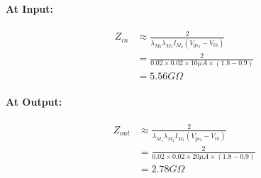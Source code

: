 \begin{enumerate}
    \paragraph{At Input:}
    \begin{align*}
      Z_{in} &\approx \frac{2}{\lambda_{M_0} \lambda_{M_3} I_{M_0} (V_{gs_3} - V_{th})} \\
             &= \frac{2}{0.02 \times 0.02 \times 10 \mu A \times (1.8 - 0.9)} \\
             &= 5.56 G\Omega
    \end{align*}
    \paragraph{At Output:}
    \begin{align*}
      Z_{out} &\approx \frac{2}{\lambda_{M_1} \lambda_{M_2} I_{M_1} (V_{gs_2} - V_{th})} \\
              &= \frac{2}{0.02 \times 0.02 \times 20 \mu A \times (1.8 - 0.9)} \\
              &= 2.78 G\Omega
    \end{align*}
\end{enumerate}

